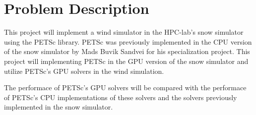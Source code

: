 \section{Problem Description}

This project will implement a wind simulator in the HPC-lab's snow simulator 
using the PETSc library. PETSc was previously implemented in the CPU version
of the snow simulator by Mads Buvik Sandvei for his specialization project.
This project will implementing PETSc in the GPU version of the snow simulator
and utilize PETSc's GPU solvers in the wind simulation. 

The performace of PETSc's GPU solvers will be compared with the performace
of PETSc's CPU implementations of these solvers and the solvers previously
implemented in the snow simulator.